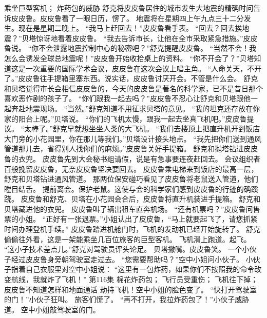 \documentclass[a4paper,12pt,UTF8,twoside]{ctexbook}
\begin{document}
        乘坐巨型客机； 
        炸药包的威胁   
        舒克将皮皮鲁居住的城市发生大地震的精确时问告诉皮皮鲁。皮皮鲁看了一眼日历，愣了。 
        地震将在星期四上午九点三十二分发生。现在是星期二晚上。 
        “我马上赶回去！”皮皮鲁看手表。 
        “回去？回去挨地震？”贝塔惊讶地看着皮皮鲁。 
        “我去告诉市长，让他在全市采取紧急措施。”皮皮鲁说。 
        “你不会泄露地震控制中心的秘密吧？”舒克提醒皮皮鲁。 
        “当然不会！我怎么会诱发全球总地震呢！”皮皮鲁开始收拾桌上的资料。 
        “你不开会了？”贝塔知道这是一次重要的国际学术会议，皮皮鲁在这次会议上唱主角。 
        “人命关天，不开了。”皮皮鲁往手提箱里塞东西。说实话，皮皮鲁讨厌开会。不管是什么会。 
        舒克和贝塔觉得市长会相信皮皮鲁的，今天的皮皮鲁是著名的科学家，已不是昔日那个喜欢恶作剧的孩子了。 
        “你们跟我一起去吗？”皮皮鲁不忍心让舒克和贝塔跟他一起奔赴地震现场。 
        “当然。”舒克知道不用征求贝塔的意见。 
        “我的坦克还存放在你家的阳台上呢。”贝塔说。 
        “你们的飞机太慢，跟我一起去坐真飞机吧。”皮皮鲁提议。 
        “太棒了。”舒克早就想坐坐人类的大飞机。 
        “我们去楼顶上把直升机开到饭店大门旁的小花园里，你在那儿等我们。”贝塔设计接头地点。 
        “我先把你们送到通风管道那儿去，省得别人找你们的麻烦。”皮皮鲁关好手提箱。 
        舒克和抛塔钻进皮皮鲁的衣兜。 
        皮皮鲁先到大会秘书组请假，说是有急事要连夜赶回去。 
        会议组织者百般挽留皮皮鲁，无奈皮皮鲁坚决要回去。 
        皮皮鲁乘电梯来到饭店的最高一层，舒克和贝塔钻进通风管道。 
        那两位保安碰巧看见了皮皮鲁将老鼠送入管道，他们瞠目结舌。 
        提前离会。保护老鼠。这使与会的科学家们感到皮皮鲁的行迹的确蹊跷。 
        皮皮鲁和舒克、贝塔在小花园会合后，皮皮鲁将直升机装进手提箱。 
        舒克和贝塔藏进他的衣兜。 
        皮皮鲁叫了辆出租车直奔机场。 
        “还有机票吗？”皮皮鲁问售票的小姐。 
        “正好有一张退票。”小姐认出了皮皮鲁，“马上就要起飞了，请您抓紧时间办理登机手续。” 
        皮皮鲁踏进机舱门时，飞机的发动机已经开始旋转了。 
        舒克偷偷往外看，这是一架能乘坐几百位旅客的巨型客机。 
        飞机滑上跑道。起飞。 
        “这小子技术差点儿。”舒克对驾驶员评头论足。 
        贝塔撇嘴。皮皮鲁笑。 
        一个小伙子经过皮皮鲁身旁朝驾驶室走过去。 
        “您需要帮助吗？”空中小姐问小伙子。 
        小伙子指着自己衣服里对空中小姐说：  “这里有一包炸药，如果你们不按照我的命令改变航线，我就炸了飞机！”   第116集 
        棉花炸药包； 
        飞行员受重伤； 
        飞机往下掉； 
        皮皮鲁不知道怎样和地面通话   
        劫持飞机！空中小姐的脸色变了。 
        “快打开驾驶室的门！”小伙子狂叫。 
        旅客们慌了。 
        “再不打开，我拉炸药包了！”小伙子威胁道。 
        空中小姐敲驾驶室的门。 
\end{document}
